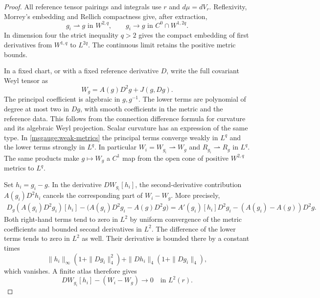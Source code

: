 \documentclass[11pt]{article}
\numberwithin{equation}{section}
\theoremstyle{definition}
\theoremstyle{remark}
\begin{document}
\begin{proof}
All reference tensor pairings and integrals use \(r\) and
\(d\mu=dV_r\). Reflexivity, Morrey's embedding and Rellich compactness
give, after extraction,
\begin{equation}\label{msgauge:weak-metrics}
 g_i\rightharpoonup g\text{ in }W^{2,q},\qquad
 g_i\longrightarrow g\text{ in }C^0\cap W^{1,2q}.
\end{equation}
In dimension four the strict inequality \(q>2\) gives the compact
embedding of first derivatives from \(W^{1,q}\) to \(L^{2q}\).
The continuous limit retains the positive metric bounds.

In a fixed chart, or with a fixed reference derivative \(D\), write
the full covariant Weyl tensor as
\begin{equation}\label{msgauge:curvature-map}
 W_g=A(g)D^2g+J(g,Dg).
\end{equation}
The principal coefficient is algebraic in \(g,g^{-1}\). The lower
terms are polynomial of degree at most two in \(Dg\), with smooth
coefficients in the metric and the reference data. This follows
from the connection difference formula for curvature and its
algebraic Weyl projection. Scalar curvature has an expression of
the same type. In \eqref{msgauge:weak-metrics} the principal terms
converge weakly in \(L^q\) and the lower terms strongly in \(L^q\).
In particular \(W_i=W_{g_i}\rightharpoonup W_g\) and
\(R_{g_i}\rightharpoonup R_g\) in \(L^q\).
The same products make \(g\mapsto W_g\) a \(C^1\) map from the open
cone of positive \(W^{2,q}\) metrics to \(L^q\).

Set \(h_i=g_i-g\). In the derivative \(DW_{g_i}[h_i]\), the
second-derivative contribution \(A(g_i)D^2h_i\) cancels the
corresponding part of \(W_i-W_g\). More precisely,
\[
 \begin{split}
 D_g(A(g_i)D^2g_i)[h_i]
     -\big(A(g_i)D^2g_i-A(g)D^2g\big)
  =A'(g_i)[h_i]D^2g_i-(A(g_i)-A(g))D^2g .
 \end{split}
\]
Both right-hand terms tend to zero in \(L^2\) by uniform convergence
of the metric coefficients and bounded second derivatives in \(L^2\).
The difference of the lower terms tends to zero in \(L^2\)
as well. Their derivative is bounded there by a constant times
\[
 \|h_i\|_\infty(1+\|Dg_i\|_4^2)
    +\|Dh_i\|_4(1+\|Dg_i\|_4),
\]
which vanishes. A finite atlas therefore gives
\begin{equation}\label{msgauge:metric-test}
 DW_{g_i}[h_i]-(W_i-W_g)\longrightarrow0\quad\text{in }L^2(r).
\end{equation}


\end{proof}
\end{document}
